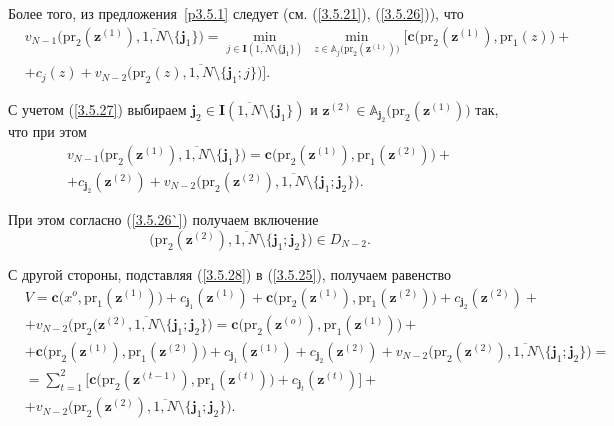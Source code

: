 \documentclass[11pt,twoside,openany]{report}
\newcommand{\bfn}{\begin{equation}}
\newcommand{\efn}{\end{equation}}
\newcommand{\ov}{\overline}
\newcommand{\sm}{\setminus}
\newcommand{\bba}{{\mathbb A}}
\begin{document}
{Более того, из предложения~\ref{p3.5.1} следует
(см. (\ref{3.5.21}), (\ref{3.5.26})),
что
\begin{eqnarray}
  &v_{N-1}\bigl(\mathrm{pr}_2(\mathbf{z}^{(1)}),\ov{1,N}\sm\{\mathbf{j}_1\}\bigl) =
  \min\limits_{j\in \mathbf{I}(\ov{1,N}\sm\{\mathbf{j}_1\})}\ \min\limits_{z\in
  \bba_j\bigl(\mathrm{pr}_2(\mathbf{z}^{(1)})\bigl)}\bigl[\mathbf{c}
  \bigl(\mathrm{pr}_2(\mathbf{z}^{(1)}),
  \mathrm{pr}_1(z)\bigl) +
  &\nonumber\\
  &+ c_j(z) + v_{N-2}\bigl(\mathrm{pr}_2(z),\ov{1,N}\sm\{\mathbf{j}_1;j\}\bigl)\bigl].
  &
  \label{3.5.27}
\end{eqnarray}

С учетом (\ref{3.5.27})
выбираем
$\mathbf{j}_2\in \mathbf{I}(\ov{1,N}\sm\{\mathbf{j}_1\})$
и $\mathbf{z}^{(2)}\in \bba_{\mathbf{j}_2}\bigl(\mathrm{pr}_2(\mathbf{z}^{(1)})\bigl)$
так, что при этом
\begin{eqnarray}
  &v_{N-1}\bigl(\mathrm{pr}_2(\mathbf{z}^{(1)}),\ov{1,N}\sm\{\mathbf{j}_1\}\bigl) =
  \mathbf{c}\bigl(\mathrm{pr}_2(\mathbf{z}^{(1)}),\mathrm{pr}_1(\mathbf{z}^{(2)})) +
  &\nonumber\\
  &+c_{\mathbf{j}_2}(\mathbf{z}^{(2)}) + v_{N-2}\bigl(\mathrm{pr}_2(\mathbf{z}^{(2)}),
  \ov{1,N}\sm\{\mathbf{j}_1;\mathbf{j}_2\}\bigl)
  .
  \label{3.5.28}
\end{eqnarray}

При этом согласно (\ref{3.5.26`}) получаем включение
\bfn
  \label{3.5.28}
  \bigl(\mathrm{pr}_2(\mathbf{z}^{(2)}),\ov{1,N}\sm\{\mathbf{j}_1;\mathbf{j}_2\}\bigl)\in D_{N-2}
  .
\efn

С другой стороны,
подставляя (\ref{3.5.28}) в (\ref{3.5.25}),
получаем равенство
\begin{eqnarray}
  &V = \mathbf{c}\bigl(x^o,\mathrm{pr}_1(\mathbf{z}^{(1)})\bigl) +
  c_{\mathbf{j}_1}(\mathbf{z}^{(1)}) + \mathbf{c}\bigl(\mathrm{pr}_2(\mathbf{z}^{(1)}),
  \mathrm{pr}_1(\mathbf{z}^{(2)})\bigl) + c_{\mathbf{j}_2}(\mathbf{z}^{(2)}) +
  &\nonumber\\
  &+v_{N-2}\bigl(\mathrm{pr}_2(\mathbf{z}^{(2)},\ov{1,N}\sm\{\mathbf{j}_1;\mathbf{j}_2\}\bigl) =
  \mathbf{c}\bigl(\mathrm{pr}_2(\mathbf{z}^{(o)}),\mathrm{pr}_1(\mathbf{z}^{(1)})\bigl) +
  &\nonumber\\
  &+ \mathbf{c}\bigl(\mathrm{pr}_2(\mathbf{z}^{(1)}),\mathrm{pr}_1(\mathbf{z}^{(2)})\bigl) +
  c_{\mathbf{j}_1}(\mathbf{z}^{(1)}) + c_{\mathbf{j}_2}(\mathbf{z}^{(2)}) +
  v_{N-2}\bigl(\mathrm{pr}_2(\mathbf{z}^{(2)}),\ov{1,N}\sm\{\mathbf{j}_1;\mathbf{j}_2\}\bigl) =
  &\nonumber\\
  &= \sum\limits_{t=1}^2 \bigl[\mathbf{c}\bigl(\mathrm{pr}_2(\mathbf{z}^{(t-1)}),
  \mathrm{pr}_1(\mathbf{z}^{(t)})\bigl) + c_{\mathbf{j}_t}(\mathbf{z}^{(t)})\bigl] +
  &\nonumber\\
  &+v_{N-2}\bigl(\mathrm{pr}_2(\mathbf{z}^{(2)}),\ov{1,N}\sm\{\mathbf{j}_1;\mathbf{j}_2\}\bigl).
  &
  \label{3.5.30}
\end{eqnarray}

}
\end{document}

